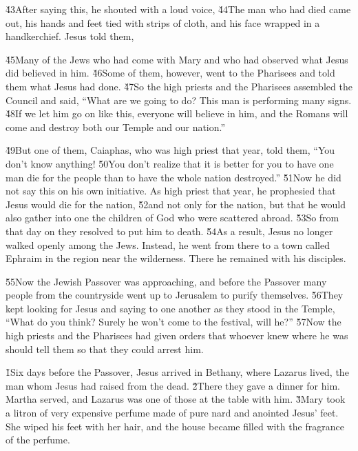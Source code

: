 \v{43}After saying this, he shouted with a loud voice,  \v{44}The man who had died came out, his hands and feet tied with strips of cloth, and his face wrapped in a handkerchief. Jesus told them, 

\v{45}Many of the Jews who had come with Mary and who had observed what Jesus did believed in him. \v{46}Some of them, however, went to the Pharisees and told them what Jesus had done. \v{47}So the high priests and the Pharisees assembled the Council and said, ``What are we going to do? This man is performing many signs. \v{48}If we let him go on like this, everyone will believe in him, and the Romans will come and destroy both our Temple and our nation.''

\v{49}But one of them, Caiaphas, who was high priest that year, told them, ``You don't know anything! \v{50}You don't realize that it is better for you to have one man die for the people than to have the whole nation destroyed.'' \v{51}Now he did not say this on his own initiative. As high priest that year, he prophesied that Jesus would die for the nation, \v{52}and not only for the nation, but that he would also gather into one the children of God who were scattered abroad. \v{53}So from that day on they resolved to put him to death. \v{54}As a result, Jesus no longer walked openly among the Jews. Instead, he went from there to a town called Ephraim in the region near the wilderness. There he remained with his disciples.

\v{55}Now the Jewish Passover was approaching, and before the Passover many people from the countryside went up to Jerusalem to purify themselves. \v{56}They kept looking for Jesus and saying to one another as they stood in the Temple, ``What do you think? Surely he won't come to the festival, will he?'' \v{57}Now the high priests and the Pharisees had given orders that whoever knew where he was should tell them so that they could arrest him.

\v{1}Six days before the Passover, Jesus arrived in Bethany, where Lazarus lived, the man whom Jesus had raised from the dead. \v{2}There they gave a dinner for him. Martha served, and Lazarus was one of those at the table with him. \v{3}Mary took a litron of very expensive perfume made of pure nard and anointed Jesus' feet. She wiped his feet with her hair, and the house became filled with the fragrance of the perfume.

